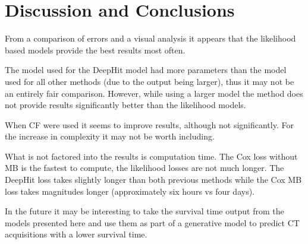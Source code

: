     \section{Discussion and Conclusions} \label{sec:deep_learning_for_ct_based_survival_analysis_of_idiopathic_pulmonary_fibrosis_patients_appendix_discussion_and_conclusions}
        From a comparison of errors and a visual analysis it appears that the likelihood based models provide the best results most often.
        
        The model used for the DeepHit model had more parameters than the model used for all other methods (due to the output being larger), thus it may not be an entirely fair comparison. However, while using a larger model the method does not provide results significantly better than the likelihood models.
        
        When \gls{CF} were used it seems to improve results, although not significantly. For the increase in complexity it may not be worth including.
        
        What is not factored into the results is computation time. The Cox loss without \gls{MB} is the fastest to compute, the likelihood losses are not much longer. The DeepHit loss takes slightly longer than both previous methods while the Cox \gls{MB} loss takes magnitudes longer (approximately six hours vs four days).
    
        In the future it may be interesting to take the survival time output from the models presented here and use them as part of a generative model to predict \gls{CT} acquisitions with a lower survival time.
    